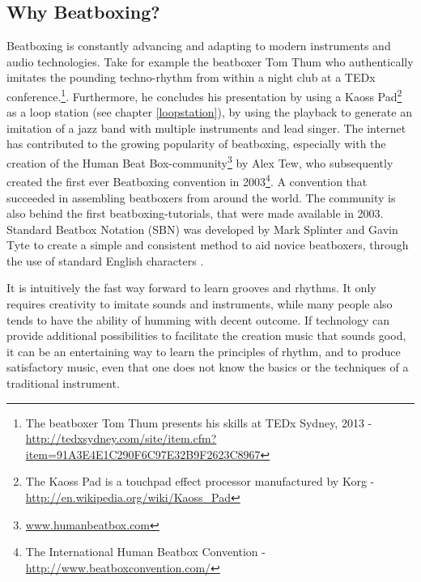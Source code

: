 \subsection{ Why Beatboxing? }
Beatboxing is constantly advancing and adapting to modern instruments and audio technologies. Take for example the beatboxer Tom Thum who authentically imitates the pounding techno-rhythm from within a night club at a TEDx conference.\footnote{The beatboxer Tom Thum presents his skills at TEDx Sydney, 2013 - \url{http://tedxsydney.com/site/item.cfm?item=91A3E4E1C290F6C97E32B9F2623C8967}}. Furthermore, he concludes his presentation by using a Kaoss Pad\footnote{The Kaoss Pad is a touchpad effect processor manufactured by Korg - \url{http://en.wikipedia.org/wiki/Kaoss_Pad}} as a loop station (see chapter \ref{loopstation}), by using the playback to generate an imitation of a jazz band with multiple instruments and lead singer. The internet has contributed to the growing popularity of beatboxing, especially with the creation of the Human Beat Box-community\footnote{\url{www.humanbeatbox.com}} by Alex Tew, who subsequently created the first ever Beatboxing convention in 2003\footnote{The International Human Beatbox Convention - \url{http://www.beatboxconvention.com/}}. A convention that succeeded in assembling beatboxers from around the world. The community is also behind the first beatboxing-tutorials, that were made available in 2003. Standard Beatbox Notation (SBN) was developed by Mark Splinter and Gavin Tyte to create a simple and consistent method to aid novice beatboxers, through the use of standard English characters \citep{tyte2005}.

It is intuitively the fast way forward to learn grooves and rhythms. It only requires creativity to imitate sounds and instruments, while many people also tends to have the ability of humming with decent outcome. If technology can provide additional possibilities to facilitate the creation music that sounds good, it can be an entertaining way to learn the principles of rhythm, and to produce satisfactory music, even that one does not know the basics or the techniques of a traditional instrument. 
